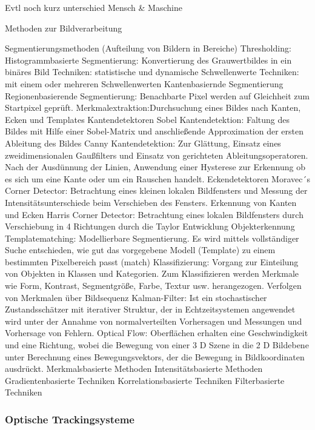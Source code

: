 \begin{itemize}
    Evtl noch kurz unterschied Mensch & Maschine

    Methoden zur Bildverarbeitung \cite{Bildverarbeitung}

    Segmentierungsmethoden (Aufteilung von Bildern in Bereiche)
      Thresholding: Histogrammbasierte Segmentierung: Konvertierung des Grauwertbildes in ein binäres Bild
        Techniken: statistische und dynamische Schwellenwerte
        Techniken: mit einem oder mehreren Schwellenwerten
      Kantenbasiernde Segmentierung
      Regionenbasierende Segmentierung: Benachbarte Pixel werden auf Gleichheit zum Startpixel geprüft.
    Merkmalextraktion:Durchsuchung eines Bildes nach Kanten, Ecken und Templates
      Kantendetektoren
        Sobel Kantendetektion: Faltung des Bildes mit Hilfe einer Sobel-Matrix und anschließende Approximation der ersten Ableitung des Bildes
        Canny Kantendetektion: Zur Glättung, Einsatz eines zweidimensionalen Gaußfilters und Einsatz von gerichteten Ableitungsoperatoren. Nach der Ausdünnung der Linien, Anwendung einer Hysterese zur Erkennung ob es sich um eine Kante oder um ein Rauschen handelt.
    Eckendetektoren
      Moravec´s Corner Detector: Betrachtung eines kleinen lokalen Bildfensters und Messung der Intensitätsunterschiede beim Verschieben des Fensters. Erkennung von Kanten und Ecken
      Harris Corner Detector: Betrachtung eines lokalen Bildfensters durch Verschiebung in 4 Richtungen durch die Taylor Entwicklung
    Objekterkennung 
      Templatematching: Modellierbare Segmentierung. Es wird mittels vollständiger Suche entschieden, wie gut das vorgegebene Modell (Template) zu einem bestimmten Pixelbereich passt (match)
      Klassifizierung: Vorgang zur Einteilung von Objekten in Klassen und Kategorien. Zum Klassifizieren werden Merkmale wie Form, Kontrast, Segmentgröße, Farbe, Textur usw. herangezogen.
    Verfolgen von Merkmalen über Bildsequenz 
      Kalman-Filter: Ist ein stochastischer Zustandsschätzer mit iterativer Struktur, der in Echtzeitsystemen angewendet wird unter der Annahme von normalverteilten Vorhersagen und Messungen und Vorhersage von Fehlern.
      Optical Flow: Oberflächen erhalten eine Geschwindigkeit und eine Richtung, wobei die Bewegung von einer 3 D Szene in die 2 D Bildebene unter Berechnung eines Bewegungsvektors, der die Bewegung in Bildkoordinaten ausdrückt.
        Merkmalsbasierte Methoden
        Intensitätsbasierte Methoden
          Gradientenbasierte Techniken
          Korrelationsbasierte Techniken
          Filterbasierte Techniken

\subsubsection{Optische Trackingsysteme}


\end{itemize}
